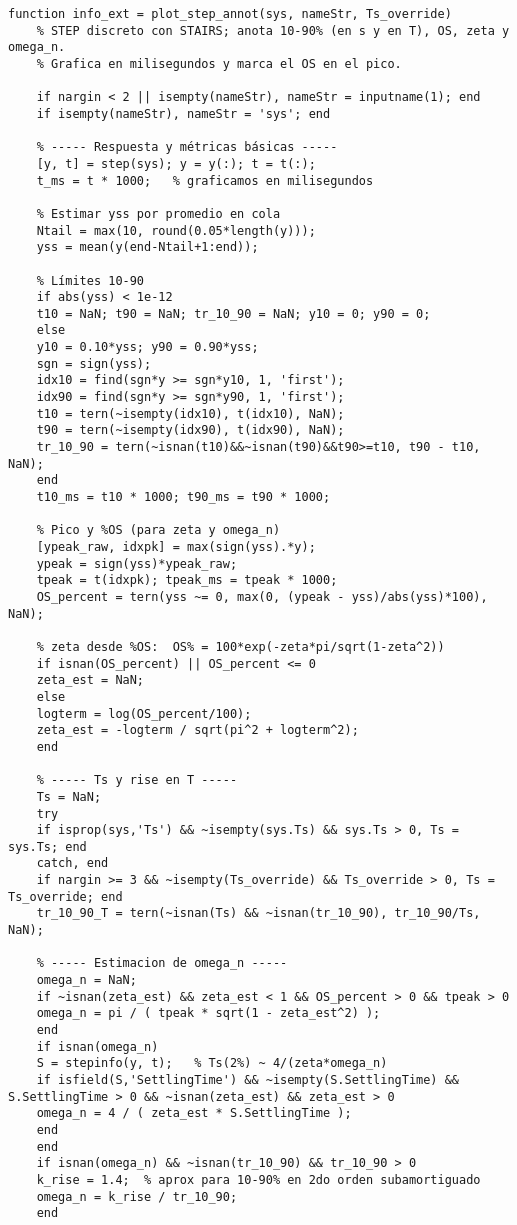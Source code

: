 \begin{lstlisting}[style=matlabstyle,caption={Funciones desarrolladas para la práctica.},label={matlab:func}]
	function info_ext = plot_step_annot(sys, nameStr, Ts_override)
	% STEP discreto con STAIRS; anota 10-90% (en s y en T), OS, zeta y omega_n.
	% Grafica en milisegundos y marca el OS en el pico.
	
	if nargin < 2 || isempty(nameStr), nameStr = inputname(1); end
	if isempty(nameStr), nameStr = 'sys'; end
	
	% ----- Respuesta y métricas básicas -----
	[y, t] = step(sys); y = y(:); t = t(:);
	t_ms = t * 1000;   % graficamos en milisegundos
	
	% Estimar yss por promedio en cola
	Ntail = max(10, round(0.05*length(y)));
	yss = mean(y(end-Ntail+1:end));
	
	% Límites 10-90
	if abs(yss) < 1e-12
	t10 = NaN; t90 = NaN; tr_10_90 = NaN; y10 = 0; y90 = 0;
	else
	y10 = 0.10*yss; y90 = 0.90*yss;
	sgn = sign(yss);
	idx10 = find(sgn*y >= sgn*y10, 1, 'first');
	idx90 = find(sgn*y >= sgn*y90, 1, 'first');
	t10 = tern(~isempty(idx10), t(idx10), NaN);
	t90 = tern(~isempty(idx90), t(idx90), NaN);
	tr_10_90 = tern(~isnan(t10)&&~isnan(t90)&&t90>=t10, t90 - t10, NaN);
	end
	t10_ms = t10 * 1000; t90_ms = t90 * 1000;
	
	% Pico y %OS (para zeta y omega_n)
	[ypeak_raw, idxpk] = max(sign(yss).*y);
	ypeak = sign(yss)*ypeak_raw;
	tpeak = t(idxpk); tpeak_ms = tpeak * 1000;
	OS_percent = tern(yss ~= 0, max(0, (ypeak - yss)/abs(yss)*100), NaN);
	
	% zeta desde %OS:  OS% = 100*exp(-zeta*pi/sqrt(1-zeta^2))
	if isnan(OS_percent) || OS_percent <= 0
	zeta_est = NaN;
	else
	logterm = log(OS_percent/100);
	zeta_est = -logterm / sqrt(pi^2 + logterm^2);
	end
	
	% ----- Ts y rise en T -----
	Ts = NaN;
	try
	if isprop(sys,'Ts') && ~isempty(sys.Ts) && sys.Ts > 0, Ts = sys.Ts; end
	catch, end
	if nargin >= 3 && ~isempty(Ts_override) && Ts_override > 0, Ts = Ts_override; end
	tr_10_90_T = tern(~isnan(Ts) && ~isnan(tr_10_90), tr_10_90/Ts, NaN);
	
	% ----- Estimacion de omega_n -----
	omega_n = NaN;
	if ~isnan(zeta_est) && zeta_est < 1 && OS_percent > 0 && tpeak > 0
	omega_n = pi / ( tpeak * sqrt(1 - zeta_est^2) );
	end
	if isnan(omega_n)
	S = stepinfo(y, t);   % Ts(2%) ~ 4/(zeta*omega_n)
	if isfield(S,'SettlingTime') && ~isempty(S.SettlingTime) && S.SettlingTime > 0 && ~isnan(zeta_est) && zeta_est > 0
	omega_n = 4 / ( zeta_est * S.SettlingTime );
	end
	end
	if isnan(omega_n) && ~isnan(tr_10_90) && tr_10_90 > 0
	k_rise = 1.4;  % aprox para 10-90% en 2do orden subamortiguado
	omega_n = k_rise / tr_10_90;
	end
	

\end{lstlisting}
